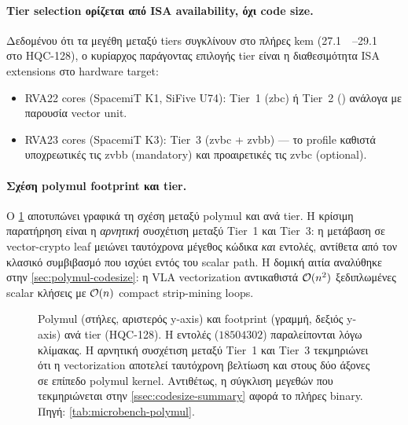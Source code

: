 \paragraph{Tier selection ορίζεται από ISA availability, όχι code size.}
Δεδομένου ότι τα μεγέθη μεταξύ tiers συγκλίνουν στο πλήρες \gls{kem}
(\SIrange{27.1}{29.1}{\kilo\byte} στο HQC-128), ο κυρίαρχος παράγοντας
επιλογής tier είναι η διαθεσιμότητα ISA extensions στο hardware target:
\begin{itemize}
  \item RVA22 cores (SpacemiT K1, SiFive U74): Tier~1 (\gls{zbc}) ή Tier~2
    (\RVV) ανάλογα με παρουσία vector unit.
  \item RVA23 cores (SpacemiT K3): Tier~3 (\gls{zvbc} + \gls{zvbb}) — το
    profile καθιστά υποχρεωτικές τις \gls{zvbb} (mandatory) και προαιρετικές
    τις \gls{zvbc} (optional).
\end{itemize}

\paragraph{Σχέση polymul footprint και tier.}
Ο \cref{fig:code-size-dual-axis} αποτυπώνει γραφικά τη σχέση μεταξύ
polymul  και \instret ανά tier. Η κρίσιμη παρατήρηση
είναι η \emph{αρνητική} συσχέτιση μεταξύ Tier~1 και Tier~3: η
μετάβαση σε vector-crypto leaf μειώνει ταυτόχρονα μέγεθος κώδικα
\emph{και} εντολές, αντίθετα από τον κλασικό συμβιβασμό
 που ισχύει εντός του scalar
path. Η δομική αιτία αναλύθηκε στην \cref{sec:polymul-codesize}:
η VLA vectorization αντικαθιστά $\mathcal{O}(n^2)$ ξεδιπλωμένες scalar
κλήσεις με $\mathcal{O}(n)$ compact strip-mining loops.

\begin{figure}[htbp]
  \centering
  
  \caption{Polymul \instret (στήλες, αριστερός y-axis) και 
    footprint (γραμμή, δεξιός y-axis) ανά tier (HQC-128). Η
     εντολές ($\num{18504302}$) παραλείπονται λόγω
    κλίμακας. Η αρνητική συσχέτιση μεταξύ Tier~1 και Tier~3
    τεκμηριώνει ότι η vectorization αποτελεί ταυτόχρονη βελτίωση
    και στους δύο άξονες σε επίπεδο polymul kernel. Αντιθέτως, η σύγκλιση μεγεθών που τεκμηριώνεται στην \cref{ssec:codesize-summary} αφορά το πλήρες \KEM binary. Πηγή: \cref{tab:microbench-polymul}.}
  \label{fig:code-size-dual-axis}
\end{figure}


